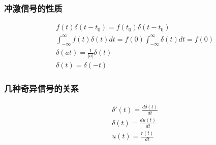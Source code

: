\documentclass[12pt, a4paper, oneside]{ctexart}
\begin{document}
\subsubsection{冲激信号的性质}
\begin{align*}
    &f(t)\delta(t-t_0)=f(t_0)\delta(t-t_0)\\
    &\int_{-\infty}^{\infty}f(t)\delta(t)dt=f(0)\int_{-\infty}^{\infty}\delta(t)dt=f(0)\\
    &\delta(at)=\frac{1}{|a|}\delta(t)\\
    &\delta(t)=\delta(-t)
\end{align*}

\subsubsection{几种奇异信号的关系}
\begin{align*}
    &\delta'(t)=\frac{d\delta(t)}{dt}\\
    &\delta(t)=\frac{du(t)}{dt}\\
    &u(t)=\frac{r(t)}{dt}
\end{align*}
\end{document}
